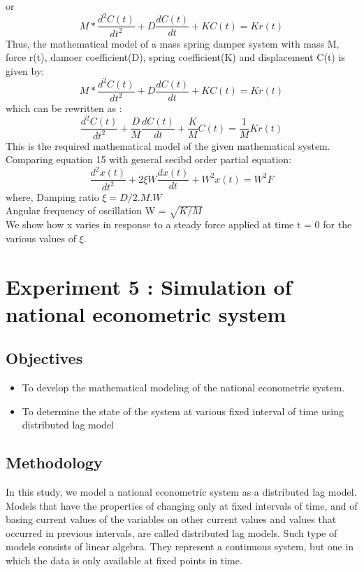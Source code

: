 \documentclass[10pt,journal,cspaper,compsoc]{IEEEtran}
\begin{document}
 or
 \begin{equation*}
  M * \frac{d^2C(t)}{dt^2} + D \frac{dC(t)}{dt} + K C(t) = Kr(t)
 \end{equation*}
 Thus, the mathematical model of a mass spring damper system with mass M, force r(t), damoer coefficient(D), spring coefficient(K) and displacement C(t) is given by: 
 \begin{equation}
  M * \frac{d^2C(t)}{dt^2} + D \frac{dC(t)}{dt} + K C(t) = Kr(t)
 \end{equation}
 which can be rewritten as :
 \begin{equation}
  \frac{d^2C(t)}{dt^2} + \frac{D}{M} \frac{dC(t)}{dt} + \frac{K}{M} C(t) = \frac{1}{M} Kr(t)
 \end{equation}
 This is the required mathematical model of the given mathematical system. Comparing equation 15 with general secibd order partial equation:
 \begin{equation}
  \frac{d^2x(t)}{dt^2} + 2 \xi W \frac{dx(t)}{dt} + W^2 x(t) = W^2 F
 \end{equation}
 where, Damping ratio  
 \begin{math}
  \xi = D/2 . M . W
 \end{math}
 \\Angular frequency of oscillation W = 
 \begin{math}
  \sqrt{K/M}
 \end{math} 
 \\We show how x varies in response to a steady force applied at time t = 0 for the various values of \begin{math}
  \xi .
 \end{math}
\section{Experiment 5 : Simulation of national econometric system}
\subsection{Objectives}
\begin{itemize}
  \item To develop the mathematical modeling of the national econometric system.
  \item To determine the state of the system at various fixed interval of time using distributed lag model
\end{itemize}
\subsection{Methodology}
  In this study, we model a national econometric system as a distributed lag model. Models that have the properties of changing only at fixed intervals of time, and of basing current values  of the variables on other current values and values that occurred in previous intervals, are called distributed lag models. Such type of models consists of linear algebra. They represent a continuous system, but one in which the data is only available at fixed
  points in time.
\end{document}
